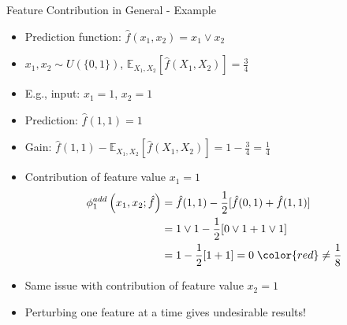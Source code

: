 \documentclass[dvipsnames]{beamer}
\newcommand{\red}[1]{{\color{red} #1}}
\begin{document}


\begin{frame}[shrink=20]{Feature Contribution in General - Example}
	\begin{itemize}
		\item<1-> Prediction function: $\hat{f}(x_1, x_2) = x_1 \lor x_2$
		\item<1-> $x_1, x_2 \sim U(\{0, 1\})$, $\mathbb{E}_{X_1,X_2}\left[\hat{f}(X_1,X_2)\right] = \frac{3}{4}$
		\vspace{2em}
		\item<2-> E.g., input: $x_1 = 1$, $x_2 = 1$
		\item<2-> Prediction: $\hat{f}(1, 1) = 1$
		\item<2-> Gain: $\hat{f}(1, 1) - \mathbb{E}_{X_1,X_2}\left[\hat{f}(X_1,X_2)\right] = 1 - \frac{3}{4} = \frac{1}{4}$
		\vspace{2em}
		\item<3-> Contribution of feature value $x_1 = 1$
		\begin{align}\begin{split}
			\phi^{add}_1\left(x_1, x_2;\hat{f}\right) 
			&=\hat{f}(1, 1)-\frac{1}{2} [\hat{f}(0, 1) + \hat{f}(1, 1)]\\
			&=1 \lor 1-\frac{1}{2} [0 \lor 1 + 1 \lor 1]\\
			&=1 -\frac{1}{2} [1 + 1] = 0 \; \red{\neq \frac{1}{8}}
		\end{split}\end{align}
		\item<4-> Same issue with contribution of feature value $x_2 = 1$
		\vspace{2em}
		\item<5-> \red{Perturbing one feature at a time gives undesirable results!}
	\end{itemize}
\end{frame}
\end{document}
